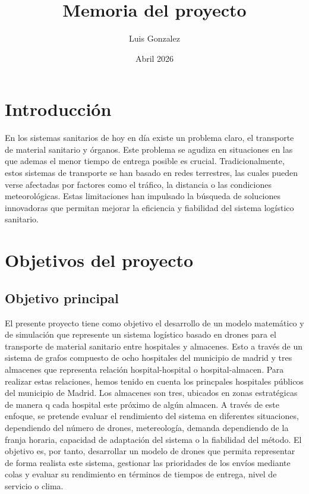 \documentclass[11pt, a4paper]{article} %
\title{\textbf{Memoria del proyecto}}
\author{Luis Gonzalez}
\date{Abril 2026}
\begin{document}
\maketitle

\section{Introducción}
En los sistemas sanitarios de hoy en día existe un problema claro, el transporte de material sanitario y órganos. Este problema se agudiza en situaciones en las que ademas el menor tiempo de entrega posible es crucial. Tradicionalmente, estos sistemas de transporte se han basado en redes terrestres, las cuales pueden verse afectadas por factores como el tráfico, la distancia o las condiciones meteorológicas. Estas limitaciones han impulsado la búsqueda de soluciones innovadoras que permitan mejorar la eficiencia y fiabilidad del sistema logístico sanitario.

\section{Objetivos del proyecto}

\subsection{Objetivo principal}
El presente proyecto tiene como objetivo el desarrollo de un modelo matemático y de simulación que represente un sistema logístico basado en drones para el transporte de material sanitario entre hospitales y almacenes. Esto a través de un sistema de grafos compuesto de ocho hospitales del municipio de madrid y tres almacenes que representa relación hospital-hospital o hospital-almacen. Para realizar estas relaciones, hemos tenido en cuenta los princpales hospitales públicos del municipio de Madrid. Los almacenes son tres, ubicados en zonas estratégicas de manera q cada hospital este próximo de algún almacen. A través de este enfoque, se pretende evaluar el rendimiento del sistema en diferentes situaciones, dependiendo del número de drones, metereología, demanda dependiendo de la franja horaria, capacidad de adaptación del sistema o la fiabilidad del método. El objetivo es, por tanto, desarrollar un modelo de drones que permita representar de forma realista este sistema, gestionar las prioridades de los envíos mediante colas y evaluar su rendimiento en términos de tiempos de entrega, nivel de servicio o clima.
\end{document}

